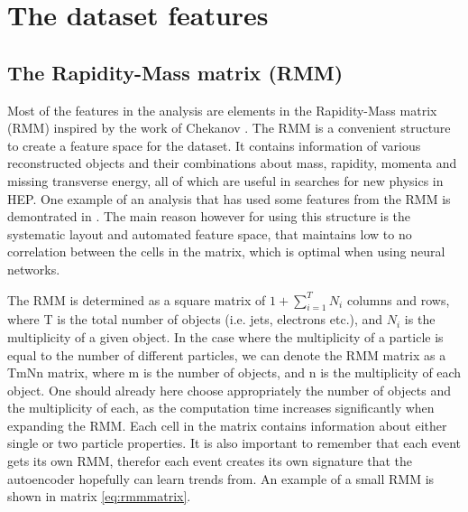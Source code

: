 \section{The dataset features}

\subsection*{The Rapidity-Mass matrix (RMM)}\label{sec:rmm}
Most of the features in the analysis are elements in the Rapidity-Mass matrix (RMM) inspired by the work of Chekanov
\cite{Chekanov_2019}. The RMM is a convenient structure to create a feature space for the dataset. It contains 
information of various reconstructed objects and their combinations about mass, rapidity, momenta and missing transverse 
energy, all of which are useful in searches for new physics in HEP\cite{Chekanov_2021}. One example of an analysis 
that has used some features from the RMM is demontrated in \cite{Santos_2017}. The main reason however for 
using this structure is the systematic layout and automated feature space, that maintains low to no correlation between 
the cells in the matrix, which is optimal when using neural networks. \par
The RMM is determined as a square matrix of $1 + \sum_{i=1}^{T}N_i$ columns and rows, where T is the total 
number of objects (i.e. jets, electrons etc.), and $N_i$ is the multiplicity of a given object. In the case where the 
multiplicity of a particle is equal to the number of different particles, we can denote the RMM matrix as a TmNn matrix, where m 
is the number of objects, and n is the multiplicity of each object. One should already here choose appropriately 
the number of objects and the multiplicity of each, as the computation time increases significantly 
when expanding the RMM. Each cell in the matrix contains information about either single or two particle properties. 
It is also important to remember that each event gets its own RMM, therefor each event creates its own signature that 
the autoencoder hopefully can learn trends from. An example of a small RMM is shown in matrix \ref{eq:rmmmatrix}.

